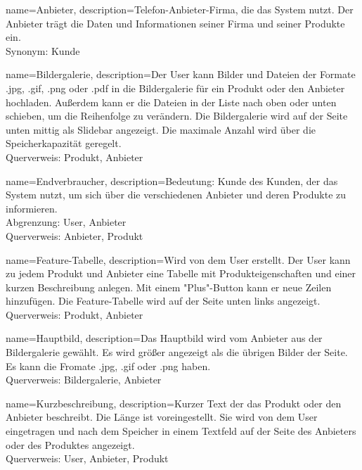 {
  name=Anbieter,
  description={Telefon-Anbieter-Firma, die das System nutzt. Der Anbieter trägt die Daten und Informationen seiner Firma und seiner Produkte ein. \\ Synonym: Kunde}
}

{
  name=Bildergalerie,
  description={Der User kann Bilder und Dateien der Formate .jpg, .gif, .png oder .pdf in die Bildergalerie für ein Produkt oder den Anbieter hochladen. Außerdem kann er die Dateien in der Liste nach oben oder unten schieben, um die Reihenfolge zu verändern. Die Bildergalerie wird auf der Seite unten mittig als Slidebar angezeigt. Die maximale Anzahl wird über die Speicherkapazität geregelt. \\ Querverweis: Produkt, Anbieter}
}

{
  name=Endverbraucher,
  description={Bedeutung: Kunde des Kunden, der das System nutzt, um sich über die verschiedenen Anbieter und deren Produkte zu informieren. \\ Abgrenzung: User, Anbieter \\ Querverweis: Anbieter, Produkt}
}

{
  name=Feature-Tabelle,
  description={Wird von dem User erstellt. Der User kann zu jedem Produkt und Anbieter eine Tabelle mit Produkteigenschaften und einer kurzen Beschreibung anlegen. Mit einem "Plus"-Button kann er neue Zeilen hinzufügen. Die Feature-Tabelle wird auf der Seite unten links angezeigt. \\ Querverweis: Produkt, Anbieter}
}

{
  name=Hauptbild,
  description={Das Hauptbild wird vom Anbieter aus der Bildergalerie gewählt. Es wird größer angezeigt als die übrigen Bilder der Seite. Es kann die Fromate .jpg, .gif oder .png haben. \\ Querverweis: Bildergalerie, Anbieter}
}

{
  name=Kurzbeschreibung,
  description={Kurzer Text der das Produkt oder den Anbieter beschreibt. Die Länge ist voreingestellt. Sie wird von dem User eingetragen und nach dem Speicher in einem Textfeld auf der Seite des Anbieters oder des Produktes angezeigt. \\ Querverweis: User, Anbieter, Produkt}
}

